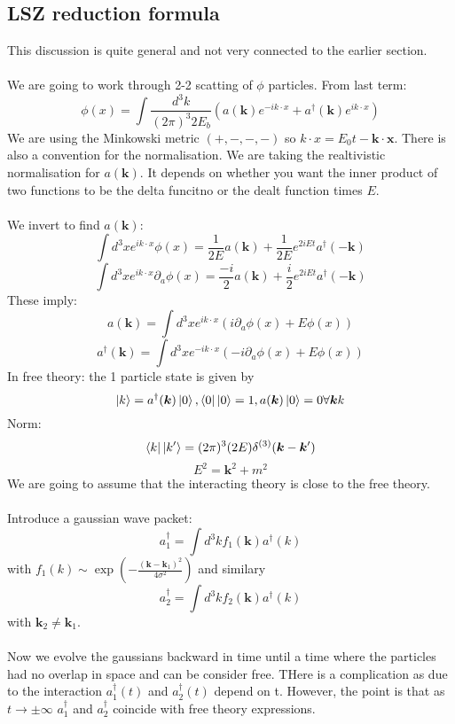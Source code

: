 \documentclass{article}
\begin{document}
\subsection{LSZ reduction formula}
This discussion is quite general and not very connected to the earlier section.\\\\
We are going to work through 2-2 scatting of $\phi$ particles. From last term:
$$
\phi(x) = \int \frac{d^3k}{(2\pi)^3 2 E_b} ( a(\bm k) e^{-i k \cdot  x} + a^{\dagger}(\bm k) e^{i  k \cdot x})
$$
We are using the Minkowski metric $(+, -, - ,- )$ so $k \cdot x = E_0 t - \bm k \cdot \bm x$. There is also a convention for the normalisation. We are taking the realtivistic normalisation for $a(\bm k)$. It depends on whether you want the inner product of two functions to be the delta funcitno or the dealt function times $E$.\\\\
We invert to find $a(\bm k)$:
$$
\int d^3 x e^{ik \cdot x} \phi(x) = \frac{1}{2E} a(\bm k) + \frac{1}{2E} e^{2 i Et} a^{\dagger} ( - \bm k)
$$
$$
\int d^3 x e^{ik\cdot x} \partial_a \phi(x) = \frac{-i}{2} a(\bm k) + \frac{i}{2} e^{2 i Et} a^{\dagger} (- \bm k)
$$
These imply:
$$
a(\bm k) = \int d^3 x e^{i k\cdot x} ( i \partial _a \phi(x) + E\phi(x))
$$
$$
a^{\dagger}(\bm k) = \int d^3 x e^{-i k\cdot x} ( -i \partial _a \phi(x) + E\phi(x))
$$
In free theory: the 1 particle state  is given by
$$
\ket{k } = a^{\dagger} (\bm k) \ket{0} , \bra{0} \ket{0} =1, a(\bm k) \ket{0} = 0 \forall \bm kk
$$
Norm:
$$
\bra{k}\ket{k'} = (2\pi)^3 (2E) \delta^{(3)}(\bm k - \bm k')
$$
$$
E^2= \bm k^2 + m^2
$$
We are going to assume that the interacting theory is  close to the free theory.\\\\
Introduce a gaussian wave packet:
$$
a_1^{\dagger} = \int d^3 k f_1( \bm k ) a^{\dagger}(k)
$$
with $f_1(k) \sim \exp( - \frac{(\bm k - \bm k_1)^2}{4 \sigma^2})$ and similary
$$
a_2^{\dagger} = \int d^3 k f_2( \bm k ) a^{\dagger}(k)
$$
with $\bm k_2 \neq \bm k_1$. \\\\
Now we evolve the gaussians backward in time until a time where the particles had no overlap in space and can be consider free. THere is a complication as due to the interaction $a_1^{\dagger}(t)$ and $a_2^{\dagger}(t)$ depend on t. However,  the point is that as $t \rightarrow \pm \infty$ $a_1^{\dagger}$ and $a_2^{\dagger}$ coincide with free theory expressions.\\\\
\end{document}
